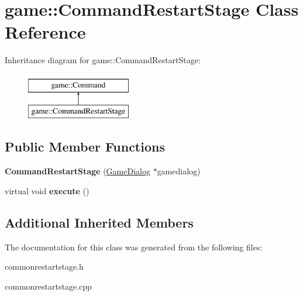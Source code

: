 \hypertarget{classgame_1_1CommandRestartStage}{}\section{game\+:\+:Command\+Restart\+Stage Class Reference}
\label{classgame_1_1CommandRestartStage}
Inheritance diagram for game\+:\+:Command\+Restart\+Stage\+:\begin{figure}[H]
\begin{center}
\leavevmode
\includegraphics[height=2.000000cm]{classgame_1_1CommandRestartStage}
\end{center}
\end{figure}
\subsection*{Public Member Functions}
\begin{DoxyCompactItemize}
\item 
\mbox{\label{classgame_1_1CommandRestartStage_acd8a536da4a5bca3fad8f6c948ce7a94}} 
{\bfseries Command\+Restart\+Stage} (\hyperlink{classgame_1_1GameDialog}{Game\+Dialog} $\ast$gamedialog)
\item 
\mbox{\label{classgame_1_1CommandRestartStage_ab4d9da97ff5958220cae2c952695ee1f}} 
virtual void {\bfseries execute} ()
\end{DoxyCompactItemize}
\subsection*{Additional Inherited Members}


The documentation for this class was generated from the following files\+:\begin{DoxyCompactItemize}
\item 
commonrestartstage.\+h\item 
commonrestartstage.\+cpp\end{DoxyCompactItemize}
